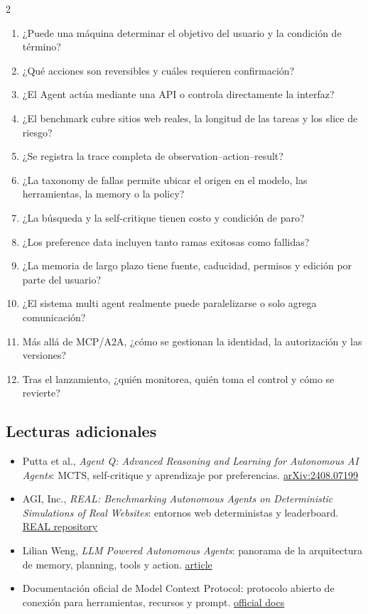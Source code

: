 \documentclass[a4paper]{article}
\begin{document}
\begin{multicols}{2}
\small
\begin{enumerate}
  \item ¿Puede una máquina determinar el objetivo del usuario y la condición de término?
  \item ¿Qué acciones son reversibles y cuáles requieren confirmación?
  \item ¿El Agent actúa mediante una API o controla directamente la interfaz?
  \item ¿El benchmark cubre sitios web reales, la longitud de las tareas y los slice de riesgo?
  \item ¿Se registra la trace completa de observation--action--result?
  \item ¿La taxonomy de fallas permite ubicar el origen en el modelo, las herramientas, la memory o la policy?
  \item ¿La búsqueda y la self-critique tienen costo y condición de paro?
  \item ¿Los preference data incluyen tanto ramas exitosas como fallidas?
  \item ¿La memoria de largo plazo tiene fuente, caducidad, permisos y edición por parte del usuario?
  \item ¿El sistema multi agent realmente puede paralelizarse o solo agrega comunicación?
  \item Más allá de MCP/A2A, ¿cómo se gestionan la identidad, la autorización y las versiones?
  \item Tras el lanzamiento, ¿quién monitorea, quién toma el control y cómo se revierte?
\end{enumerate}
\normalsize
\end{multicols}

\subsection{Lecturas adicionales}

\begin{itemize}
  \item Putta et al., \emph{Agent Q: Advanced Reasoning and Learning for Autonomous AI Agents}: MCTS, self-critique y aprendizaje por preferencias. \href{https://arxiv.org/abs/2408.07199}{arXiv:2408.07199}
  \item AGI, Inc., \emph{REAL: Benchmarking Autonomous Agents on Deterministic Simulations of Real Websites}: entornos web deterministas y leaderboard. \href{https://github.com/agi-inc/real}{REAL repository}
  \item Lilian Weng, \emph{LLM Powered Autonomous Agents}: panorama de la arquitectura de memory, planning, tools y action. \href{https://lilianweng.github.io/posts/2023-06-23-agent/}{article}
  \item Documentación oficial de Model Context Protocol: protocolo abierto de conexión para herramientas, recursos y prompt. \href{https://modelcontextprotocol.io/}{official docs}
\end{itemize}
\end{document}
